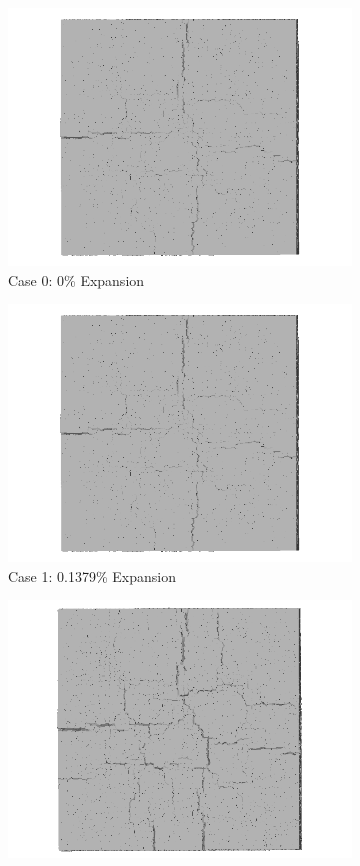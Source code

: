 \begin{figure}[!h]
\centering

    \begin{subfigure}{.5\textwidth}
      \centering
      \includegraphics[width=.8\linewidth]{Files/exp_3D/DEF/A30X0C_1_3ds.png}
    \caption{Case 0: 0\% Expansion}
    \end{subfigure}%
    \begin{subfigure}{.5\textwidth}
      \centering
      \includegraphics[width=.8\linewidth]{Files/exp_3D/DEF/A30X0C_1_3ds.png}
    \caption{Case 1: 0.1379\% Expansion}
    \end{subfigure}
    \begin{subfigure}{.5\textwidth}
      \centering
      \includegraphics[width=.8\linewidth]{Files/exp_3D/DEF/A30X0C_2_3ds.png}

\end{subfigure}
\end{figure}
